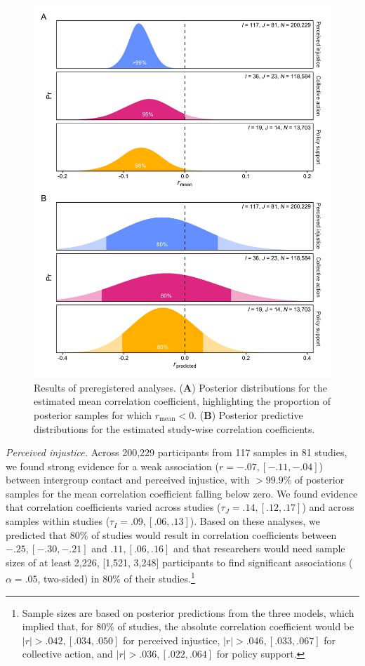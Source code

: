 \documentclass[
]{article}
\begin{document}
\begin{figure}

{\centering \includegraphics{../figures/figure-3} 

}

\caption{Results of preregistered analyses. (\textbf{A}) Posterior distributions for the estimated mean correlation coefficient, highlighting the proportion of posterior samples for which $r_\text{mean} < 0$. (\textbf{B}) Posterior predictive distributions  for the estimated study-wise correlation coefficients.}\label{fig:unnamed-chunk-3}
\end{figure}

\emph{Perceived injustice.} Across 200,229 participants from 117 samples
in 81 studies, we found strong evidence for a weak association
(\(r = -.07, [-.11, -.04]\)) between intergroup contact and perceived
injustice, with \(>99.9\%\) of posterior samples for the mean
correlation coefficient falling below zero. We found evidence that
correlation coefficients varied across studies
(\(\tau_J = .14, [.12, .17]\)) and across samples within studies
(\(\tau_I = .09, [.06, .13]\)). Based on these analyses, we predicted
that 80\% of studies would result in correlation coefficients between
\(-.25, [-.30, -.21]\) and \(.11, [.06, .16]\) and that researchers
would need sample sizes of at least 2,226, {[}1,521, 3,248{]}
participants to find significant associations (\(\alpha = .05\),
two-sided) in 80\% of their studies.\footnote{Sample sizes are based on
  posterior predictions from the three models, which implied that, for
  80\% of studies, the absolute correlation coefficient would be
  \(|r| > .042, [.034, .050]\) for perceived injustice,
  \(|r| > .046, [.033, .067]\) for collective action, and
  \(|r| > .036, [.022, .064]\) for policy support.}
\end{document}
